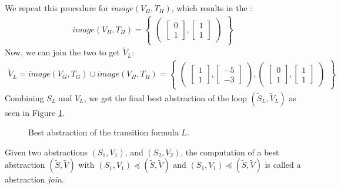 We repeat this procedure for $image(V_H, T_H)$, which results in the \qvasr:
\begin{align*}
	image(V_H, T_H) = 
	\begin{Bmatrix}
		\begin{pmatrix}
			\begin{bmatrix}
				0 \\
				1 
			\end{bmatrix},
			\begin{bmatrix}
				1 \\
				1 
			\end{bmatrix}
		\end{pmatrix}
	\end{Bmatrix}
\end{align*}  	
Now, we can join the two \qvasr to get $\tilde{V}_L$:
\begin{align*}
		\tilde{V}_L = image(V_G, T_G) \cup image(V_H, T_H) = 
	\begin{Bmatrix}
		\begin{pmatrix}
			\begin{bmatrix}
				1 \\
				1 
			\end{bmatrix},
			\begin{bmatrix}
				-5 \\
				-3 
			\end{bmatrix}
		\end{pmatrix}, 
		\begin{pmatrix}
			\begin{bmatrix}
				0 \\
				1 
			\end{bmatrix},
			\begin{bmatrix}
				1 \\
				1 
			\end{bmatrix}
		\end{pmatrix}
	\end{Bmatrix}
\end{align*}
Combining $S_L$ and $V_L$, we get the final best \qvasr abstraction of the loop $(\tilde{S}_L, \tilde{V}_L)$ as seen in Figure \ref{vasr}.
\begin{center}
	\begin{figure}[H]
		
		\caption{Best \qvasr abstraction of the transition formula $L$.}
		\label{vasr}
	\end{figure}
\end{center}
Given two \qvasr abstractions $(S_1, V_1)$, and $(S_2, V_2)$, the computation of a best \\ \qvasr abstraction $(\tilde{S}, \tilde{V})$ with $(S_1, V_1) \preceq (\tilde{S}, \tilde{V})$ and  $(S_1, V_1) \preceq (\tilde{S}, \tilde{V})$ is called a \qvasr abstraction \textsl{join}.

